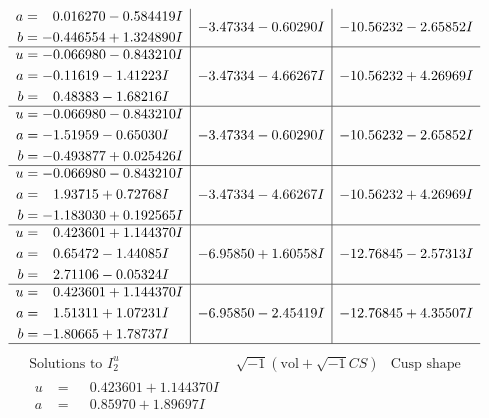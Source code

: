 \documentclass[1p]{elsarticle_modified}
\theoremstyle{definition}
\newcommand{\I}{\sqrt{-1}}
\begin{document}
$$\begin{array}{c|c|c}
\begin{aligned}
a &= \phantom{-}0.016270 - 0.584419 I \\
b &= -0.446554 + 1.324890 I\end{aligned}
 & -3.47334 - 0.60290 I & -10.56232 - 2.65852 I \\ \hline\begin{aligned}
u &= -0.066980 - 0.843210 I \\
a &= -0.11619 - 1.41223 I \\
b &= \phantom{-}0.48383 - 1.68216 I\end{aligned}
 & -3.47334 - 4.66267 I & -10.56232 + 4.26969 I \\ \hline\begin{aligned}
u &= -0.066980 - 0.843210 I \\
a &= -1.51959 - 0.65030 I \\
b &= -0.493877 + 0.025426 I\end{aligned}
 & -3.47334 - 0.60290 I & -10.56232 - 2.65852 I \\ \hline\begin{aligned}
u &= -0.066980 - 0.843210 I \\
a &= \phantom{-}1.93715 + 0.72768 I \\
b &= -1.183030 + 0.192565 I\end{aligned}
 & -3.47334 - 4.66267 I & -10.56232 + 4.26969 I \\ \hline\begin{aligned}
u &= \phantom{-}0.423601 + 1.144370 I \\
a &= \phantom{-}0.65472 - 1.44085 I \\
b &= \phantom{-}2.71106 - 0.05324 I\end{aligned}
 & -6.95850 + 1.60558 I & -12.76845 - 2.57313 I \\ \hline\begin{aligned}
u &= \phantom{-}0.423601 + 1.144370 I \\
a &= \phantom{-}1.51311 + 1.07231 I \\
b &= -1.80665 + 1.78737 I\end{aligned}
 & -6.95850 - 2.45419 I & -12.76845 + 4.35507 I\\
 \hline 
 \end{array}$$\newpage$$\begin{array}{c|c|c}  
\text{Solutions to }I^u_{2}& \I (\text{vol} + \sqrt{-1}CS) & \text{Cusp shape}\\
 \hline 
\begin{aligned}
u &= \phantom{-}0.423601 + 1.144370 I \\
a &= \phantom{-}0.85970 + 1.89697 I \\

\end{aligned}
\end{array}$$
\end{document}
